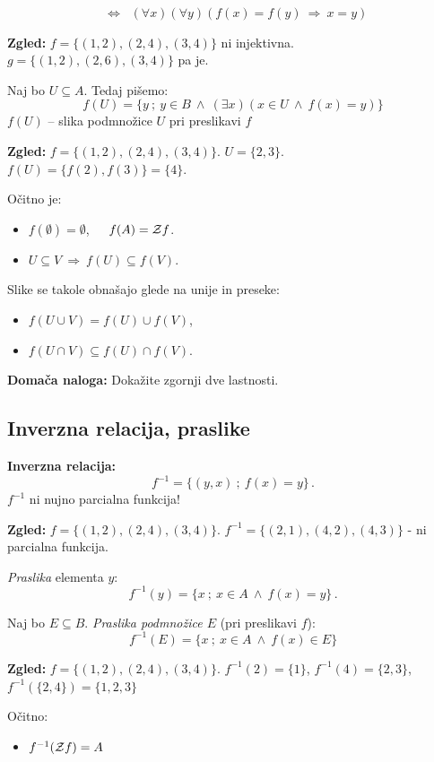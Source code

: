 \documentclass[11pt,paper=b5,footinclude,headinclude]{scrbook} %
\def\inn {{~\wedge~}}
\def\sledi {{~\Rightarrow~}}
\def\cee {{~\Leftrightarrow~}}
\begin{document}
~~~~~~~~~~~~~~~$\cee$ $(\forall x)(\forall y)(f(x) = f(y) \sledi x = y)$

\bigskip
\textbf{ Zgled:} $f = \{(1,2),(2,4),(3,4)\}$ ni injektivna.
$g = \{(1,2),(2,6),(3,4)\}$ pa je.

\bigskip
Naj bo $U\subseteq A$. Tedaj pišemo:
$$f(U) = \{y~;~y\in B\inn (\exists x)(x\in U\inn f(x) = y)\}$$
$f(U)$ -- slika podmnožice $U$ pri preslikavi $f$

\bigskip
\textbf{ Zgled:} $f = \{(1,2),(2,4),(3,4)\}$.
$U = \{2,3\}$. $f(U) = \{f(2),f(3)\} = \{4\}$.

\medskip
Očitno je:
\begin{itemize}
  \item $f(\emptyset) = \emptyset$,~~~$f(A) = {\cal Z}f$.
  \item $U\subseteq V\sledi f(U)\subseteq f(V)$.
\end{itemize}

Slike se takole obnašajo glede na unije in preseke:
\begin{itemize}
  \item $f(U\cup V) = f(U)\cup f(V)$,
  \item $f(U\cap V) \subseteq f(U)\cap f(V)$.
\end{itemize}

\textbf{ Domača naloga:} Dokažite zgornji dve lastnosti.


\subsection{Inverzna relacija, praslike}

\bigskip
\textbf{ Inverzna relacija:}
$$f^{-1} = \{(y,x)~;~f(x) = y\}\,.$$
$f^{-1}$ ni nujno parcialna funkcija!

\medskip
\textbf{ Zgled:} $f = \{(1,2),(2,4),(3,4)\}$.
$f^{-1} = \{(2,1),(4,2),(4,3)\}$ - ni parcialna funkcija.

\medskip
{\em Praslika} elementa $y$:
$$f^{-1}(y) = \{x~;~x\in A\inn f(x) = y\}\,.$$

Naj bo $E\subseteq B$. {\em Praslika podmnožice $E$} (pri preslikavi $f$):
$$f^{-1}(E) = \{x~;~x\in A\inn f(x) \in E\}$$

\medskip
\textbf{ Zgled:} $f = \{(1,2),(2,4),(3,4)\}$.
$f^{-1}(2) = \{1\}$, $f^{-1}(4) = \{2,3\}$, $f^{-1}(\{2,4\}) = \{1,2,3\}$
\medskip

Očitno:
\begin{itemize}
  \item $f^{-1}({\cal Z}f) = A$
\end{itemize}
\end{document}
